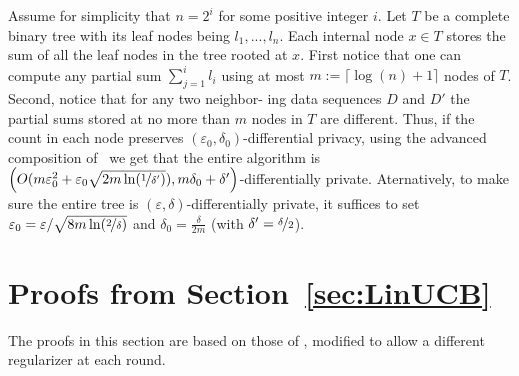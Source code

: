 \documentclass{article}
\begin{document}
Assume for simplicity that $n=2^i$ for some positive integer $i$. Let $T$ be a complete binary tree with its leaf nodes being $l_1,...,l_n$. Each internal
node $x\in T$ stores the sum of all the leaf nodes in the tree
rooted at $x$. First notice that one can compute any partial sum $\sum_{j=1}^i l_i$ using at most $m:=\lceil\log(n)+1\rceil$ nodes of $T$. Second, notice that for any two neighbor-
ing data sequences $D$ and $D'$ the partial sums stored at no more than $m$ nodes in $T$ are different. Thus, if the count in each node preserves $(\varepsilon_0,\delta_0)$-differential privacy, using the advanced composition of~\cite{DworkRothblumVadhan2010} we get that the entire algorithm is $\left(O(m\varepsilon_0^2+\varepsilon_0\sqrt{2m\ln(\nicefrac 1{\delta'})}), m\delta_0 + \delta'\right)$-differentially private. Aternatively, to make sure the entire tree is $(\varepsilon,\delta)$-differentially private, it suffices to set $\varepsilon_0 = \varepsilon / \sqrt{8m\ln(\nicefrac 2 \delta)}$ and $\delta_0= \tfrac \delta{2m}$ (with $\delta'=\nicefrac \delta 2$).

\section{Proofs from Section~\ref{sec:LinUCB}}

The proofs in this section are based on those of
\citet{AbbasiYadkoriImprovedAlgorithmsLinear2011}, modified to allow a
different regularizer at each round.

\CalcBeta*
\end{document}
